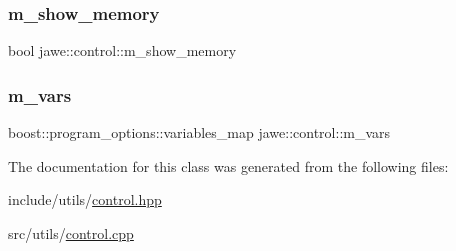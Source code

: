 \subsubsection{\texorpdfstring{m\+\_\+show\+\_\+memory}{m\_show\_memory}}
{\footnotesize\ttfamily bool jawe\+::control\+::m\+\_\+show\+\_\+memory\hspace{0.3cm}{\ttfamily [private]}}

\mbox{\label{classjawe_1_1control_ada42ec370e2de6b2473e76efffaf25af}} 
\subsubsection{\texorpdfstring{m\+\_\+vars}{m\_vars}}
{\footnotesize\ttfamily boost\+::program\+\_\+options\+::variables\+\_\+map jawe\+::control\+::m\+\_\+vars\hspace{0.3cm}{\ttfamily [private]}}



The documentation for this class was generated from the following files\+:\begin{DoxyCompactItemize}
\item 
include/utils/\hyperlink{control_8hpp}{control.\+hpp}\item 
src/utils/\hyperlink{control_8cpp}{control.\+cpp}\end{DoxyCompactItemize}
